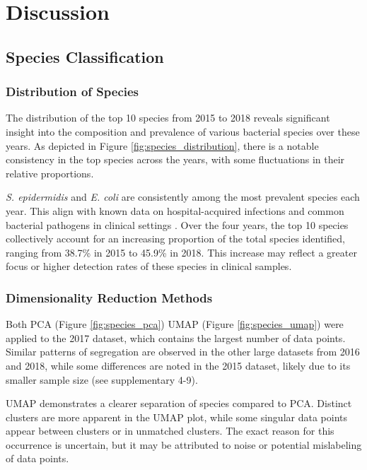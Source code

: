 \documentclass[english,11pt,a4paper,titlepage]{article}
\begin{document}
\clearpage

\section*{Discussion}
\subsection*{Species Classification}
\subsubsection*{Distribution of Species}
The distribution of the top 10 species from 2015 to 2018 reveals significant insight into the composition and prevalence of various bacterial species over these years. As depicted in Figure \ref{fig:species_distribution}, there is a notable consistency in the top species across the years, with some fluctuations in their relative proportions.

\textit{S. epidermidis} and \textit{E. coli} are consistently among the most prevalent species each year. This align with known data on hospital-acquired infections and common bacterial pathogens in clinical settings \cite{ottoStaphylococcusEpidermidisAccidental2009,russoMedicalEconomicImpact2003}. Over the four years, the top 10 species collectively account for an increasing proportion of the total species identified, ranging from 38.7\% in 2015 to 45.9\% in 2018. This increase may reflect a greater focus or higher detection rates of these species in clinical samples.

\subsubsection*{Dimensionality Reduction Methods}
Both PCA (Figure \ref{fig:species_pca}) UMAP (Figure \ref{fig:species_umap}) were applied to the 2017 dataset, which contains the largest number of data points. Similar patterns of segregation are observed in the other large datasets from 2016 and 2018, while some differences are noted in the 2015 dataset, likely due to its smaller sample size (see supplementary 4-9).

UMAP demonstrates a clearer separation of species compared to PCA. Distinct clusters are more apparent in the UMAP plot, while some singular data points appear between clusters or in unmatched clusters. The exact reason for this occurrence is uncertain, but it may be attributed to noise or potential mislabeling of data points.
\end{document}
